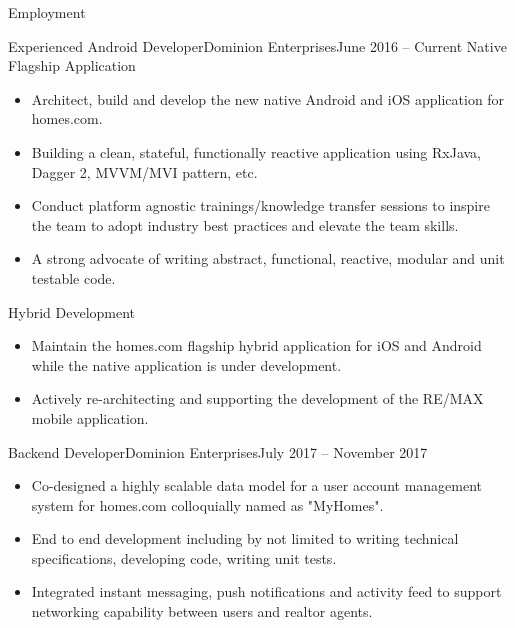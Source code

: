 \documentclass{mcdowellcv}
\begin{document}
	\makeheader
	
	\begin{cvsection}{Employment}
		\begin{cvsubsection}{Experienced Android Developer}{Dominion Enterprises}{June 2016 -- Current}
			Native Flagship Application
			\begin{itemize}
				\item Architect, build and develop the new native Android and iOS application for homes.com.
				\item Building a clean, stateful, functionally reactive application using RxJava, Dagger 2, MVVM/MVI pattern, etc.
				\item Conduct platform agnostic trainings/knowledge transfer sessions to inspire the team to adopt industry best practices and elevate the team skills.
				\item A strong advocate of writing abstract, functional, reactive, modular and unit testable code.
			\end{itemize}

			Hybrid Development
			\begin{itemize}
				\item Maintain the homes.com flagship hybrid application for iOS and Android while the native application is under development.
				\item Actively re-architecting and supporting the development of the RE/MAX mobile application.
			\end{itemize}
		\end{cvsubsection}
		
		\begin{cvsubsection}{Backend Developer}{Dominion Enterprises}{July 2017 -- November 2017}	
			\begin{itemize}
				\item Co-designed a highly scalable data model for a user account management system for homes.com colloquially named as "MyHomes".
				\item End to end development including by not limited to writing technical specifications, developing code, writing unit tests.
				\item Integrated instant messaging, push notifications and activity feed to support networking capability between users and realtor agents.
			\end{itemize}
		\end{cvsubsection}
		

\end{cvsection}
\end{document}
